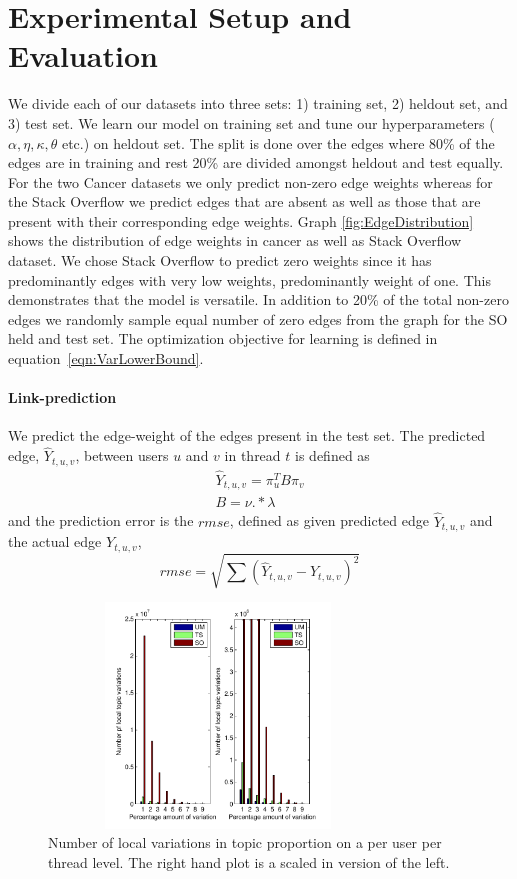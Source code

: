 \documentclass{sig-alternate}
\begin{document}
\section{Experimental Setup and Evaluation}
\label{sec:setup}
We divide each of our datasets into three sets: 1) training set, 2) heldout set,
and 3) test set. We learn our model on training set and tune our hyperparameters
($\alpha, \eta, \kappa, \theta$ etc.) on heldout set. The split is done over the
edges where 80\% of the edges are in training and rest 20\% are divided amongst
heldout and test equally. 
For the two Cancer datasets we only predict non-zero edge weights whereas for
the Stack Overflow we predict edges that are absent as well as those that are
present with their corresponding edge weights. Graph
\ref{fig:EdgeDistribution} shows the distribution of edge weights in
cancer as well as Stack Overflow dataset. We chose Stack Overflow to predict
zero weights since it has predominantly edges with very low weights,
predominantly weight of one. This demonstrates that the model is versatile. In
addition to 20\% of the total non-zero edges we randomly sample equal
number of zero edges from the graph for the SO held and test set. 
The optimization objective for learning is defined in
equation~\ref{eqn:VarLowerBound}.
\paragraph{Link-prediction} We predict the edge-weight of the edges present in
the test set. The predicted edge, $\hat{Y}_{t,u,v}$, between users $u$ and
$v$ in thread $t$ is  defined as 
\begin{align}
\hat{Y}_{t,u,v} = \pi^T_uB\pi_v\label{eqn:prediction}\\
B=\nu.*\lambda\label{eqn:blockMat}
\end{align}
and the prediction error is the $rmse$, defined as given predicted edge
$\hat{Y}_{t,u,v}$ and the actual edge $Y_{t,u,v}$,
\begin{equation}
rmse=\sqrt{\sum(\hat{Y}_{t,u,v}-Y_{t,u,v})^2}
\end{equation}

\begin{figure}
\begin{center}
\includegraphics[height=6cm,width=9cm]{TopicVariationsLocal.pdf}
\end{center}
\caption{Number of local variations in topic proportion on a per user per thread
level. The right hand plot is a scaled in version of the left.}
\label{fig:localTopicVariations}
\end{figure}
\end{document}
